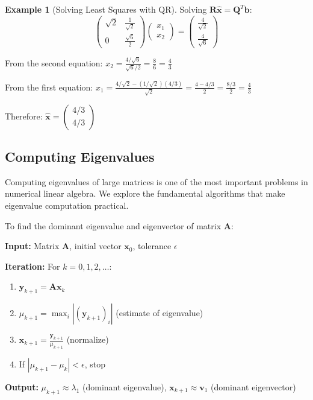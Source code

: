 \documentclass[12pt]{article}
\numberwithin{equation}{section}
\newcommand{\vect}[1]{\boldsymbol{#1}}   %
\newcommand{\mat}[1]{\mathbf{#1}}        %
\theoremstyle{plain}
\theoremstyle{definition}
\newtheorem{example}[theorem]{Example}
\theoremstyle{remark}
\begin{document}
\begin{example}[Solving Least Squares with QR]
Solving $\mat{R}\hat{\vect{x}} = \mat{Q}^T\vect{b}$:
$$\begin{pmatrix} \sqrt{2} & \frac{1}{\sqrt{2}} \\ 0 & \frac{\sqrt{6}}{2} \end{pmatrix}\begin{pmatrix} x_1 \\ x_2 \end{pmatrix} = \begin{pmatrix} \frac{4}{\sqrt{2}} \\ \frac{4}{\sqrt{6}} \end{pmatrix}$$

From the second equation: $x_2 = \frac{4/\sqrt{6}}{\sqrt{6}/2} = \frac{8}{6} = \frac{4}{3}$

From the first equation: $x_1 = \frac{4/\sqrt{2} - (1/\sqrt{2})(4/3)}{\sqrt{2}} = \frac{4 - 4/3}{2} = \frac{8/3}{2} = \frac{4}{3}$

Therefore: $\hat{\vect{x}} = \begin{pmatrix} 4/3 \\ 4/3 \end{pmatrix}$
\end{example}

\subsection{Computing Eigenvalues}

Computing eigenvalues of large matrices is one of the most important problems in numerical linear algebra. We explore the fundamental algorithms that make eigenvalue computation practical.

\begin{algorithm}[H]
\caption{Power Method}
To find the dominant eigenvalue and eigenvector of matrix $\mat{A}$:

\textbf{Input:} Matrix $\mat{A}$, initial vector $\vect{x}_0$, tolerance $\epsilon$

\textbf{Iteration:} For $k = 0, 1, 2, \ldots$:
\begin{enumerate}
\item $\vect{y}_{k+1} = \mat{A}\vect{x}_k$
\item $\mu_{k+1} = \max_i |(\vect{y}_{k+1})_i|$ (estimate of eigenvalue)
\item $\vect{x}_{k+1} = \frac{\vect{y}_{k+1}}{\mu_{k+1}}$ (normalize)
\item If $|\mu_{k+1} - \mu_k| < \epsilon$, stop
\end{enumerate}

\textbf{Output:} $\mu_{k+1} \approx \lambda_1$ (dominant eigenvalue), $\vect{x}_{k+1} \approx \vect{v}_1$ (dominant eigenvector)
\end{algorithm}
\end{document}
